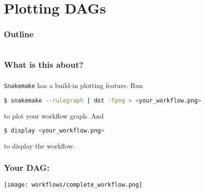 \section{Plotting DAGs}

\begin{frame}
    \frametitle{Outline}
    \begin{columns}[t]
        \begin{column}{.5\textwidth}
            \tableofcontents[sections={1-9},currentsection]
        \end{column}
        \begin{column}{.5\textwidth}
            \tableofcontents[sections={10-18},currentsection]
        \end{column}
    \end{columns}
\end{frame}

\begin{frame}
  \frametitle{What is this about?}
\end{frame}


\begin{frame}[fragile]
  \frametitle{}
  \texttt{Snakemake} has a build-in plotting feature. Run 
  \begin{lstlisting}[language=Bash, style=Shell]
$ snakemake --rulegraph | dot -Tpng > <your_workflow.png>
  \end{lstlisting}
  to plot your workflow graph. And
  \begin{lstlisting}[language=Bash, style=Shell]
$ display <your_workflow.png>
  \end{lstlisting}
  to display the workflow.
\end{frame}

\begin{frame}
  \frametitle{Your DAG:}
  \centering
  \texttt{[image: workflows/complete\_workflow.png]}
\end{frame}
